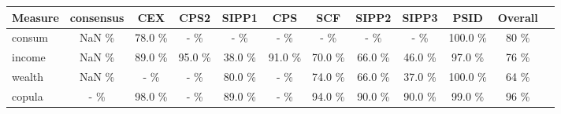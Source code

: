 \documentclass{article}
\begin{document}
\begin{center}
\begin{tabular}{|l|c|c|c|c|c|c|c|c|c|c|c|}
\hline
Measure & consensus & CEX & CPS2 & SIPP1 & CPS & SCF & SIPP2 & SIPP3 & PSID & Overall \\
\hline
consum & NaN \% & 78.0 \% & - \% & - \% & - \% & - \% & - \% & - \% & 100.0 \% & 80 \% \\
\hline
income & NaN \% & 89.0 \% & 95.0 \% & 38.0 \% & 91.0 \% & 70.0 \% & 66.0 \% & 46.0 \% & 97.0 \% & 76 \% \\
\hline
wealth & NaN \% & - \% & - \% & 80.0 \% & - \% & 74.0 \% & 66.0 \% & 37.0 \% & 100.0 \% & 64 \% \\
\hline
copula & - \% & 98.0 \% & - \% & 89.0 \% & - \% & 94.0 \% & 90.0 \% & 90.0 \% & 99.0 \% & 96 \% \\
\hline
\end{tabular}
\end{center}
\end{document}
